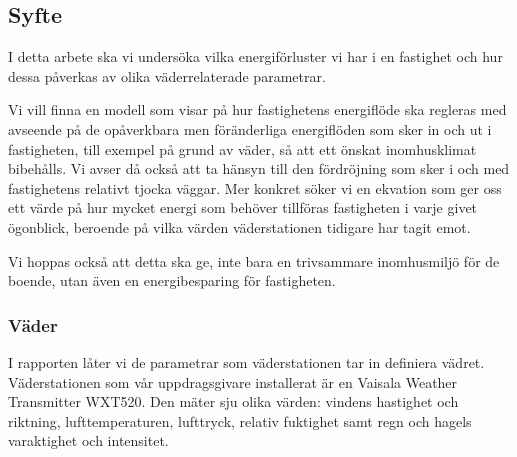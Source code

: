\subsection{Syfte}
I detta arbete ska vi undersöka vilka energiförluster vi har i en fastighet och hur dessa påverkas av olika väderrelaterade parametrar.

Vi vill finna en modell som visar på hur fastighetens energiflöde ska regleras med avseende på de opåverkbara men föränderliga energiflöden som sker in och ut i fastigheten, till exempel på grund av väder, så att ett önskat inomhusklimat bibehålls. Vi avser då också att ta hänsyn till den fördröjning som sker i och med fastighetens relativt tjocka väggar. Mer konkret söker vi en ekvation som ger oss ett värde på hur mycket energi som behöver tillföras fastigheten i varje givet ögonblick, beroende på vilka värden väderstationen tidigare har tagit emot.

Vi hoppas också att detta ska ge, inte bara en trivsammare inomhusmiljö för de boende, utan även en energibesparing för fastigheten.

\subsubsection{Väder}
I rapporten låter vi de parametrar som väderstationen tar in definiera vädret. Väderstationen som vår uppdragsgivare installerat är en Vaisala Weather Transmitter WXT520. Den mäter sju olika värden: vindens hastighet och riktning, lufttemperaturen, lufttryck, relativ fuktighet samt regn och hagels varaktighet och intensitet.

